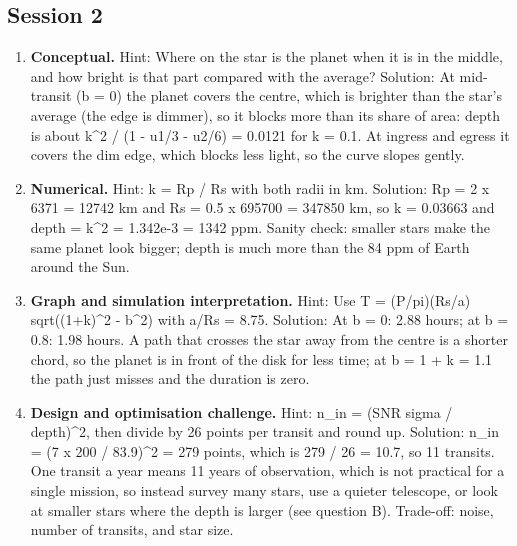 \documentclass[11pt,a4paper]{article}
\begin{document}
\subsection*{Session 2}
\begin{enumerate}[nosep]
\item \textbf{Conceptual.} Hint: Where on the star is the planet when it is in the middle, and how bright is that part compared with the average? Solution: At mid-transit (b = 0) the planet covers the centre, which is brighter than the star's average (the edge is dimmer), so it blocks more than its share of area: depth is about k\textasciicircum{}2 / (1 - u1/3 - u2/6) = 0.0121 for k = 0.1. At ingress and egress it covers the dim edge, which blocks less light, so the curve slopes gently.
\item \textbf{Numerical.} Hint: k = Rp / Rs with both radii in km. Solution: Rp = 2 x 6371 = 12742 km and Rs = 0.5 x 695700 = 347850 km, so k = 0.03663 and depth = k\textasciicircum{}2 = 1.342e-3 = 1342 ppm. Sanity check: smaller stars make the same planet look bigger; depth is much more than the 84 ppm of Earth around the Sun.
\item \textbf{Graph and simulation interpretation.} Hint: Use T = (P/pi)(Rs/a) sqrt((1+k)\textasciicircum{}2 - b\textasciicircum{}2) with a/Rs = 8.75. Solution: At b = 0: 2.88 hours; at b = 0.8: 1.98 hours. A path that crosses the star away from the centre is a shorter chord, so the planet is in front of the disk for less time; at b = 1 + k = 1.1 the path just misses and the duration is zero.
\item \textbf{Design and optimisation challenge.} Hint: n\_in = (SNR sigma / depth)\textasciicircum{}2, then divide by 26 points per transit and round up. Solution: n\_in = (7 x 200 / 83.9)\textasciicircum{}2 = 279 points, which is 279 / 26 = 10.7, so 11 transits. One transit a year means 11 years of observation, which is not practical for a single mission, so instead survey many stars, use a quieter telescope, or look at smaller stars where the depth is larger (see question B). Trade-off: noise, number of transits, and star size.
\end{enumerate}
\end{document}
